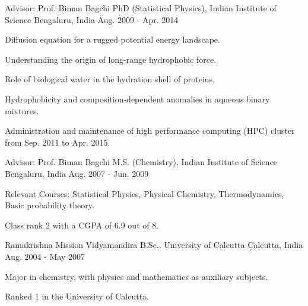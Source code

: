 


\begin{cventries}


\cventry
{Advisor: Prof. Biman Bagchi} %
{PhD (Statistical Physics), Indian Institute of Science} %
{Bengaluru, India} %
{Aug. 2009 - Apr. 2014} %
{ %
\begin{cvitems}
\item {Diffusion equation for a rugged potential energy landscape.}
\item {Understanding the origin of long-range hydrophobic force.}
\item {Role of biological water in the hydration shell of proteins.}
\item {Hydrophobicity and composition-dependent anomalies in aqueous binary mixtures.}
\item {Administration and maintenance of high performance computing (HPC) cluster from Sep. 2011 to Apr. 2015.}
\end{cvitems}
}

\cventry
{Advisor: Prof. Biman Bagchi} %
{M.S. (Chemistry), Indian Institute of Science} %
{Bengaluru, India} %
{Aug. 2007 - Jun. 2009} %
{ %
\begin{cvitems}
\item {Relevant Courses: Statistical Physics, Physical Chemistry, Thermodynamics, Basic probability theory.}
\item {Class rank 2 with a CGPA of 6.9 out of 8.}
\end{cvitems}
}

\cventry
{Ramakrishna Mission Vidyamandira} %
{B.Sc., University of Calcutta} %
{Calcutta, India} %
{Aug. 2004 - May 2007} %
{ %
\begin{cvitems}
\item {Major in chemistry, with physics and mathematics as auxiliary subjects.}
\item {Ranked 1 in the University of Calcutta.}
\end{cvitems}
}


\end{cventries}
